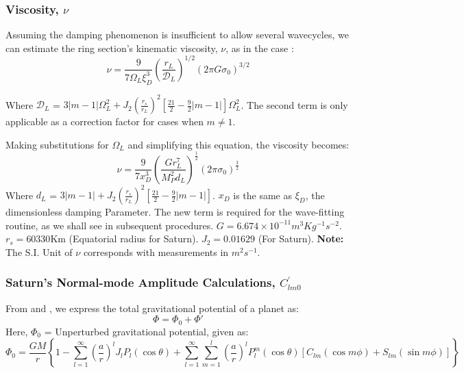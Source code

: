 \documentclass{article}
\begin{document}
\subsubsection{Viscosity, $\nu$}
Assuming the damping phenomenon is insufficient to allow several wavecycles, we can estimate the ring section's kinematic viscosity, $\nu$, as in the case \cite{GOLDREICH1978240}\cite{1984prin.conf..513S}\cite{Tiscareno_2007}:
\begin{equation}
    \nu = \frac{9}{7\Omega_{L}\xi_{D}^{3}}\left(\frac{r_{L}}{\mathcal{D}_{L}}\right)^{1/2}(2\pi G \sigma_{0})^{3/2}
\end{equation}
 
 Where $\mathcal{D}_{L}$ = $3|m-1|\Omega_{L}^{2} + J_{2}(\frac{r_{s}}{r_{L}})^{2}[\frac{21}{2}-\frac{9}{2}|m-1|]\Omega_{L}^{2}$. The second term is only applicable as a correction factor for cases when $m \neq 1$.

Making substitutions for $\Omega_{L}$ and simplifying this equation, the viscosity becomes: 
\begin{equation}
    \nu = \frac{9}{7 x_{D}^{3}}(\frac{Gr_{L}^{7}}{M_{P}^{2}d_{L}})^{\frac{1}{2}}(2\pi\sigma_{0})^{\frac{3}{2}}
\end{equation}
 Where $d_{L}$ = $3|m-1| + J_{2}(\frac{r_{s}}{r_{L}})^{2}[\frac{21}{2}-\frac{9}{2}|m-1|]$. $x_{D}$ is the same as $\xi_{D}$, the dimensionless damping Parameter. The new term is required for the wave-fitting routine, as we shall see in subsequent procedures. $G = 6.674 \times 10^{-11}m^{3} Kg^{-1} s^{-2}$. $r_{s} = 60330$Km (Equatorial radius for Saturn). $J_{2} = 0.01629$ (For Saturn). \textbf{Note:} The S.I. Unit of $\nu$ corresponds with measurements in $m^{2}s^{-1}$.


\subsubsection{Saturn's Normal-mode Amplitude Calculations, $C_{lm0}^{'}$}
From \cite{Marley1993PlanetaryAM} and \cite{Zharkov1985ThePO}, we express the total gravitational potential of a planet as: \begin{equation}
    \Phi = \Phi_{0} + \Phi{'}
\end{equation}
Here, $\Phi_{0}$ = Unperturbed gravitational potential, given as: 
\begin{equation}
\Phi_{0} = \frac{GM}{r}\left\{1 - \sum_{l=1}^{\infty}\left(\frac{a}{r}\right)^{l}J_{l}P_{l}(\cos \theta) + \sum_{l=1}^{\infty}\sum_{m=1}^{l}\left(\frac{a}{r}\right)^{l}P_{l}^{m}(\cos \theta)[C_{lm}(\cos m\phi) + S_{lm}(\sin m\phi)]\right\}
\end{equation}
\end{document}
